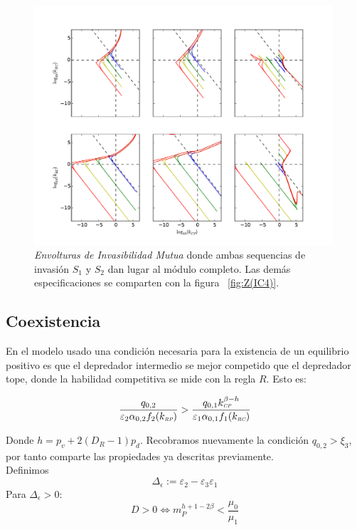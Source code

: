 \begin{figure}
  \centering
  \includegraphics[width = 0.99\textwidth]{./Plots/MutualInvAcGrGr.pdf}
  \caption[Env $I_M$]{\emph{Envolturas de Invasibilidad Mutua} donde ambas sequencias de invasi\'on $S_1$ y $S_2$ dan lugar al m\'odulo completo. Las dem\'as especificaciones se comparten con la figura ~\ref{fig:Z(IC4)}.}
  \label{fig:MutualInv}
\end{figure}


\subsection{Coexistencia}

En el modelo usado una condici\'on necesaria para la existencia de un equilibrio positivo es que el depredador intermedio se mejor competido que el depredador tope, donde la habilidad competitiva se mide con la regla $R$. Esto es:

\begin{equation}
  \frac{q_{0,2}}{\varepsilon_2 \alpha_{0,2} f_2(k_{\textit{\tiny RP}})} > \frac{q_{0,1} k_{\textit{\tiny CP}}^{\beta-h}}{\varepsilon_{1} \alpha_{0,1} f_1(k_{\textit{\tiny RC}})}
\end{equation}

Donde $ h = p_v + 2(D_R -1) p_d$. Recobramos nuevamente la condici\'on $q_{0,2} > \xi_3$, por tanto comparte las propiedades ya descritas previamente. \\
Definimos
\begin{equation}
  \Delta_\epsilon := \varepsilon_2 - \varepsilon_3 \varepsilon_1
\end{equation}
Para $\Delta_\epsilon >0$:
\begin{equation}
  D > 0 \iff m_P^{h + 1 - 2\beta} < \frac{\mu_0}{\mu_1}
\end{equation}

